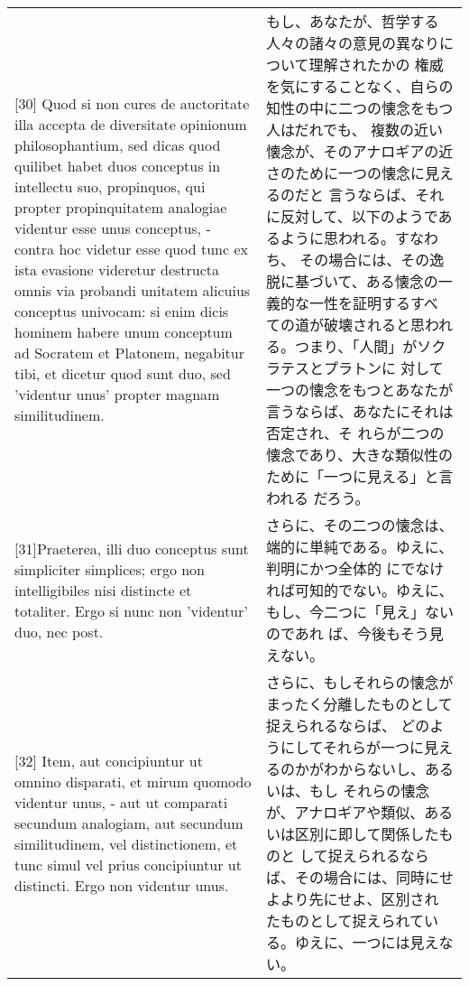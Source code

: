 \documentclass[paper=a4paper,fontsize=10pt,jafontsize=9pt,titlepage]{jlreq}
\begin{document}
\begin{longtable}{p{21em}p{21em}}
 
 
 \\

[30] Quod si non cures de auctoritate illa accepta de diversitate
opinionum philosophantium, sed dicas quod quilibet habet duos
conceptus in intellectu suo, propinquos, qui propter propinquitatem
analogiae videntur esse unus conceptus, - contra hoc videtur esse quod
tunc ex ista evasione videretur destructa omnis via probandi unitatem
alicuius conceptus univocam: si enim dicis hominem habere unum
conceptum ad Socratem et Platonem, negabitur tibi, et dicetur quod
sunt duo, sed 'videntur unus' propter magnam similitudinem.

 &

もし、あなたが、哲学する人々の諸々の意見の異なりについて理解されたかの
権威を気にすることなく、自らの知性の中に二つの懐念をもつ人はだれでも、
複数の近い懐念が、そのアナロギアの近さのために一つの懐念に見えるのだと
言うならば、それに反対して、以下のようであるように思われる。すなわち、
その場合には、その逸脱に基づいて、ある懐念の一義的な一性を証明するすべ
ての道が破壊されると思われる。つまり、「人間」がソクラテスとプラトンに
対して一つの懐念をもつとあなたが言うならば、あなたにそれは否定され、そ
れらが二つの懐念であり、大きな類似性のために「一つに見える」と言われる
だろう。
 
 \\

 [31]Praeterea, illi duo conceptus sunt simpliciter simplices; ergo
 non intelligibiles nisi distincte et totaliter. Ergo si nunc non
 'videntur' duo, nec post.

 &

 さらに、その二つの懐念は、端的に単純である。ゆえに、判明にかつ全体的
 にでなければ可知的でない。ゆえに、もし、今二つに「見え」ないのであれ
 ば、今後もそう見えない。
 
 \\

 [32] Item, aut concipiuntur ut omnino disparati, et mirum quomodo
 videntur unus, - aut ut comparati secundum analogiam, aut secundum
 similitudinem, vel distinctionem, et tunc simul vel prius
 concipiuntur ut distincti. Ergo non videntur unus.

 &

 さらに、もしそれらの懐念がまったく分離したものとして捉えられるならば、
 どのようにしてそれらが一つに見えるのかがわからないし、あるいは、もし
 それらの懐念が、アナロギアや類似、あるいは区別に即して関係したものと
 して捉えられるならば、その場合には、同時にせよより先にせよ、区別され
 たものとして捉えられている。ゆえに、一つには見えない。
 

\end{longtable}
\end{document}
